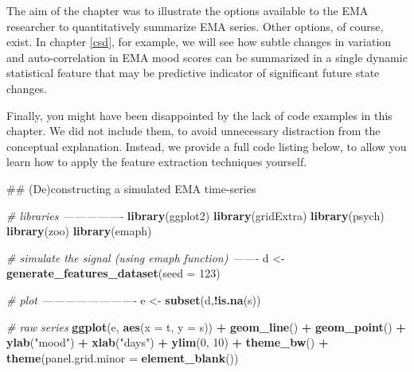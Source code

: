 \documentclass[]{book}
\newenvironment{Shaded}{\begin{snugshade}}{\end{snugshade}}
\newcommand{\KeywordTok}[1]{\textcolor[rgb]{0.13,0.29,0.53}{\textbf{#1}}}
\newcommand{\DataTypeTok}[1]{\textcolor[rgb]{0.13,0.29,0.53}{#1}}
\newcommand{\DecValTok}[1]{\textcolor[rgb]{0.00,0.00,0.81}{#1}}
\newcommand{\StringTok}[1]{\textcolor[rgb]{0.31,0.60,0.02}{#1}}
\newcommand{\CommentTok}[1]{\textcolor[rgb]{0.56,0.35,0.01}{\textit{#1}}}
\newcommand{\OperatorTok}[1]{\textcolor[rgb]{0.81,0.36,0.00}{\textbf{#1}}}
\newcommand{\NormalTok}[1]{#1}
\begin{document}
The aim of the chapter was to illustrate the options available to the
EMA researcher to quantitatively summarize EMA series. Other options, of
course, exist. In chapter \ref{csd}, for example, we will see how subtle
changes in variation and auto-correlation in EMA mood scores can be
summarized in a single dynamic statistical feature that may be
predictive indicator of significant future state changes.

Finally, you might have been disappointed by the lack of code examples
in this chapter. We did not include them, to avoid unnecessary
distraction from the conceptual explanation. Instead, we provide a full
code listing below, to allow you learn how to apply the feature
extraction techniques yourself.


\begin{Shaded}
\begin{Highlighting}[]
\NormalTok{## (De)constructing a simulated EMA time-series}

\CommentTok{# libraries ----------------}
\KeywordTok{library}\NormalTok{(ggplot2)}
\KeywordTok{library}\NormalTok{(gridExtra)}
\KeywordTok{library}\NormalTok{(psych)}
\KeywordTok{library}\NormalTok{(zoo)}
\KeywordTok{library}\NormalTok{(emaph)}

\CommentTok{# simulate the signal (using emaph function) -------}
\NormalTok{d <-}\StringTok{ }\KeywordTok{generate_features_dataset}\NormalTok{(}\DataTypeTok{seed =} \DecValTok{123}\NormalTok{)}

\CommentTok{# plot -------------------------}
\NormalTok{e <-}\StringTok{ }\KeywordTok{subset}\NormalTok{(d,}\OperatorTok{!}\KeywordTok{is.na}\NormalTok{(s))}

\CommentTok{# raw series }
\KeywordTok{ggplot}\NormalTok{(e, }\KeywordTok{aes}\NormalTok{(}\DataTypeTok{x =}\NormalTok{ t, }\DataTypeTok{y =}\NormalTok{ s)) }\OperatorTok{+}
\StringTok{  }\KeywordTok{geom_line}\NormalTok{() }\OperatorTok{+}
\StringTok{  }\KeywordTok{geom_point}\NormalTok{() }\OperatorTok{+}
\StringTok{  }\KeywordTok{ylab}\NormalTok{(}\StringTok{"mood"}\NormalTok{) }\OperatorTok{+}\StringTok{ }\KeywordTok{xlab}\NormalTok{(}\StringTok{"days"}\NormalTok{) }\OperatorTok{+}
\StringTok{  }\KeywordTok{ylim}\NormalTok{(}\DecValTok{0}\NormalTok{, }\DecValTok{10}\NormalTok{) }\OperatorTok{+}
\StringTok{  }\KeywordTok{theme_bw}\NormalTok{() }\OperatorTok{+}\StringTok{ }\KeywordTok{theme}\NormalTok{(}\DataTypeTok{panel.grid.minor =} \KeywordTok{element_blank}\NormalTok{())}



\end{Highlighting}
\end{Shaded}
\end{document}
